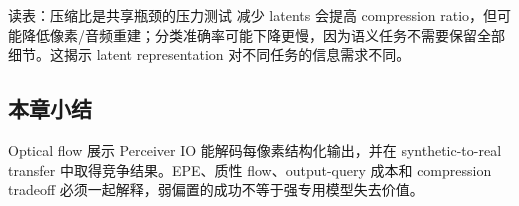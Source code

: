 
\begin{knowledgebox}{读表：压缩比是共享瓶颈的压力测试}
减少 latents 会提高 compression ratio，但可能降低像素/音频重建；分类准确率可能下降更慢，因为语义任务不需要保留全部细节。这揭示 latent representation 对不同任务的信息需求不同。
\end{knowledgebox}

\subsection{本章小结}

Optical flow 展示 Perceiver IO 能解码每像素结构化输出，并在 synthetic-to-real transfer 中取得竞争结果。EPE、质性 flow、output-query 成本和 compression tradeoff 必须一起解释，弱偏置的成功不等于强专用模型失去价值。

